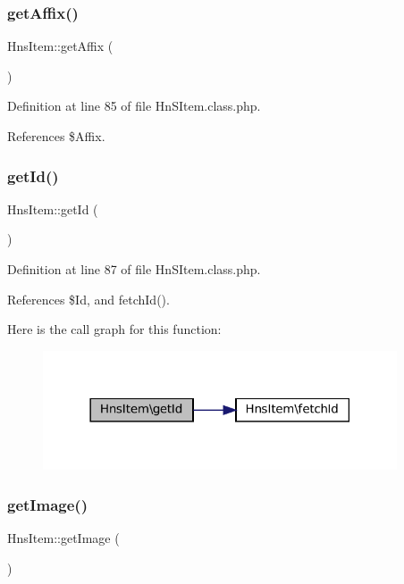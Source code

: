 \subsubsection{\texorpdfstring{get\+Affix()}{getAffix()}}
{\footnotesize\ttfamily Hns\+Item\+::get\+Affix (\begin{DoxyParamCaption}{ }\end{DoxyParamCaption})}



Definition at line 85 of file Hn\+S\+Item.\+class.\+php.



References \$\+Affix.

\mbox{\label{class_hns_item_a8d205548bb600f1c207fb726ea5d5dcc}} 
\subsubsection{\texorpdfstring{get\+Id()}{getId()}}
{\footnotesize\ttfamily Hns\+Item\+::get\+Id (\begin{DoxyParamCaption}{ }\end{DoxyParamCaption})}



Definition at line 87 of file Hn\+S\+Item.\+class.\+php.



References \$\+Id, and fetch\+Id().

Here is the call graph for this function\+:\nopagebreak
\begin{figure}[H]
\begin{center}
\leavevmode
\includegraphics[width=297pt]{class_hns_item_a8d205548bb600f1c207fb726ea5d5dcc_cgraph}
\end{center}
\end{figure}
\mbox{\label{class_hns_item_ae5cd3d2e3d7262351bf2389140a4ed82}} 
\subsubsection{\texorpdfstring{get\+Image()}{getImage()}}
{\footnotesize\ttfamily Hns\+Item\+::get\+Image (\begin{DoxyParamCaption}{ }\end{DoxyParamCaption})}



